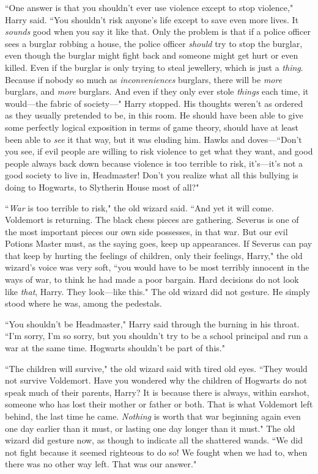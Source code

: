 ``One answer is that you shouldn't ever use violence except to stop violence," Harry said. ``You shouldn't risk anyone's life except to save even more lives. It \emph{sounds} good when you say it like that. Only the problem is that if a police officer sees a burglar robbing a house, the police officer \emph{should} try to stop the burglar, even though the burglar might fight back and someone might get hurt or even killed. Even if the burglar is only trying to steal jewellery, which is just a \emph{thing}. Because if nobody so much as \emph{inconveniences} burglars, there will be \emph{more} burglars, and \emph{more} burglars. And even if they only ever stole \emph{things} each time, it would—the fabric of society—" Harry stopped. His thoughts weren't as ordered as they usually pretended to be, in this room. He should have been able to give some perfectly logical exposition in terms of game theory, should have at least been able to \emph{see} it that way, but it was eluding him. Hawks and doves—``Don't you see, if evil people are willing to risk violence to get what they want, and good people always back down because violence is too terrible to risk, it's—it's not a good society to live in, Headmaster! Don't you realize what all this bullying is doing to Hogwarts, to Slytherin House most of all?"

``\emph{War} is too terrible to risk," the old wizard said. ``And yet it will come. Voldemort is returning. The black chess pieces are gathering. Severus is one of the most important pieces our own side possesses, in that war. But our evil Potions Master must, as the saying goes, keep up appearances. If Severus can pay that keep by hurting the feelings of children, only their feelings, Harry," the old wizard's voice was very soft, ``you would have to be most terribly innocent in the ways of war, to think he had made a poor bargain. Hard decisions do not look like \emph{that}, Harry. They look—like this." The old wizard did not gesture. He simply stood where he was, among the pedestals.

``You shouldn't be Headmaster," Harry said through the burning in his throat. ``I'm sorry, I'm so sorry, but you shouldn't try to be a school principal and run a war at the same time. Hogwarts shouldn't be part of this."

``The children will survive," the old wizard said with tired old eyes. ``They would not survive Voldemort. Have you wondered why the children of Hogwarts do not speak much of their parents, Harry? It is because there is always, within earshot, someone who has lost their mother or father or both. That is what Voldemort left behind, the last time he came. \emph{Nothing} is worth that war beginning again even one day earlier than it must, or lasting one day longer than it must." The old wizard did gesture now, as though to indicate all the shattered wands. ``We did not fight because it seemed righteous to do so! We fought when we had to, when there was no other way left. That was our answer."


